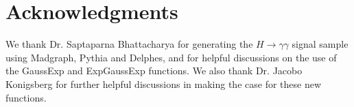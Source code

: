 \documentclass[10pt,letterpaper]{article}
\begin{document}
\section*{Acknowledgments}

We thank Dr. Saptaparna Bhattacharya for generating the $H\to\gamma\gamma$ signal sample using Madgraph, Pythia and Delphes, and for helpful discussions on the use of the GaussExp and ExpGaussExp functions. We also thank Dr. Jacobo Konigsberg for further helpful discussions in making the case for these new functions.



\end{document}
